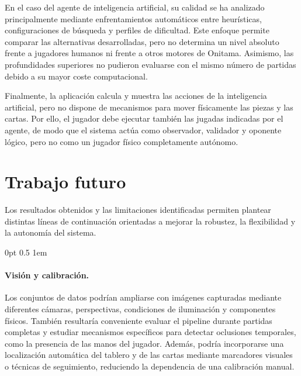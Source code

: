 En el caso del agente de inteligencia artificial, su calidad se ha analizado principalmente mediante enfrentamientos automáticos entre heurísticas, configuraciones de búsqueda y perfiles de dificultad. Este enfoque permite comparar las alternativas desarrolladas, pero no determina un nivel absoluto frente a jugadores humanos ni frente a otros motores de Onitama. Asimismo, las profundidades superiores no pudieron evaluarse con el mismo número de partidas debido a su mayor coste computacional.

Finalmente, la aplicación calcula y muestra las acciones de la inteligencia artificial, pero no dispone de mecanismos para mover físicamente las piezas y las cartas. Por ello, el jugador debe ejecutar también las jugadas indicadas por el agente, de modo que el sistema actúa como observador, validador y oponente lógico, pero no como un jugador físico completamente autónomo.


\section{Trabajo futuro}
\label{sec:trabajo-futuro}

Los resultados obtenidos y las limitaciones identificadas permiten plantear distintas líneas de continuación orientadas a mejorar la robustez, la flexibilidad y la autonomía del sistema.

\begingroup
\titlespacing*{\paragraph}
    {0pt}
    {0.5\baselineskip}
    {1em}

\paragraph{Visión y calibración.}
Los conjuntos de datos podrían ampliarse con imágenes capturadas mediante diferentes cámaras, perspectivas, condiciones de iluminación y componentes físicos. También resultaría conveniente evaluar el pipeline durante partidas completas y estudiar mecanismos específicos para detectar oclusiones temporales, como la presencia de las manos del jugador. Además, podría incorporarse una localización automática del tablero y de las cartas mediante marcadores visuales o técnicas de seguimiento, reduciendo la dependencia de una calibración manual.

